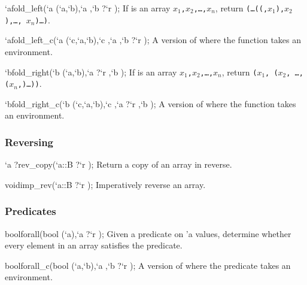 \begin{defun2}{`a}{fold_left}{(`a (`a,`b),`a ,`b {?}`r );}
  If  is an array \texttt{\lb$x_1$,$x_2$,\ldots,$x_n$\rb},
  return \texttt{(\ldots{}((,$x_1$),$x_2$),\ldots, $x_n$)\ldots)}.
\end{defun2}

\begin{defun2}{`a}{fold_left_c}{(`a (`c,`a,`b),`c ,`a ,`b {?}`r );}
  A version of  where the function  takes an
  environment.
\end{defun2}

\begin{defun2}{`b}{fold_right}{(`b (`a,`b),`a {?}`r ,`b );}
  If  is an array \texttt{\lb$x_1$,$x_2$,\ldots,$x_n$\rb},
  return \texttt{($x_1$, ($x_2$, \ldots, ($x_n$,)\ldots))}.
\end{defun2}
\begin{defun2}{`b}{fold_right_c}{(`b (`c,`a,`b),`c ,`a {?}`r ,`b );}
  A version of  where the function  takes an
  environment.
\end{defun2}

\subsubsection*{Reversing}

\begin{defun2}{`a ?}{rev_copy}{(`a::B {?}`r );}
  Return a copy of an array in reverse.
\end{defun2}

\begin{defun2}{void}{imp_rev}{(`a::B {?}`r );}
  Imperatively reverse an array.
\end{defun2}

\subsubsection*{Predicates}

\begin{defun2}{bool}{forall}{(bool (`a),`a {?}`r );}
  Given a predicate on 'a values, determine whether every element in
  an array satisfies the predicate.
\end{defun2}

\begin{defun2}{bool}{forall_c}{(bool (`a,`b),`a ,`b {?}`r );}
  A version of  where the predicate takes an environment.
\end{defun2}

